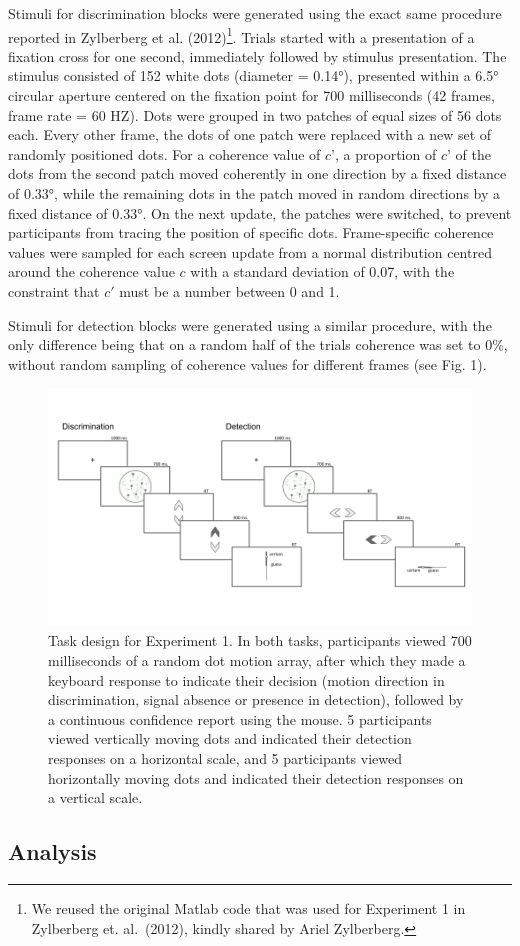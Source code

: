 \documentclass[12pt,twoside]{reedthesis}
\begin{document}
Stimuli for discrimination blocks were generated using the exact same procedure reported in Zylberberg et al. (2012)\footnote{We reused the original Matlab code that was used for Experiment 1 in Zylberberg et. al.~(2012), kindly shared by Ariel Zylberberg. }. Trials started with a presentation of a fixation cross for one second, immediately followed by stimulus presentation. The stimulus consisted of 152 white dots (diameter = 0.14°), presented within a 6.5° circular aperture centered on the fixation point for 700 milliseconds (42 frames, frame rate = 60 HZ). Dots were grouped in two patches of equal sizes of 56 dots each. Every other frame, the dots of one patch were replaced with a new set of randomly positioned dots. For a coherence value of \(c’\), a proportion of \(c’\) of the dots from the second patch moved coherently in one direction by a fixed distance of 0.33°, while the remaining dots in the patch moved in random directions by a fixed distance of 0.33°. On the next update, the patches were switched, to prevent participants from tracing the position of specific dots. Frame-specific coherence values were sampled for each screen update from a normal distribution centred around the coherence value \(c\) with a standard deviation of 0.07, with the constraint that \(c'\) must be a number between 0 and 1.

Stimuli for detection blocks were generated using a similar procedure, with the only difference being that on a random half of the trials coherence was set to 0\%, without random sampling of coherence values for different frames (see Fig. 1).
\begin{figure}
\includegraphics[width=\textwidth]{figure/ch2/designExp1} \caption[Experimental design for Exp. 1]{Task design for Experiment 1. In both tasks, participants viewed 700 milliseconds of a random dot motion array, after which they made a keyboard response to indicate their decision (motion direction in discrimination, signal absence or presence in detection), followed by a continuous confidence report using the mouse. 5 participants viewed vertically moving dots and indicated their detection responses on a horizontal scale, and 5 participants viewed horizontally moving dots and indicated their detection responses on a vertical scale. }\label{fig:ch2-exp1-design}
\end{figure}
\hypertarget{analysis-1}{%
\subsection{Analysis}\label{analysis-1}}
\end{document}

